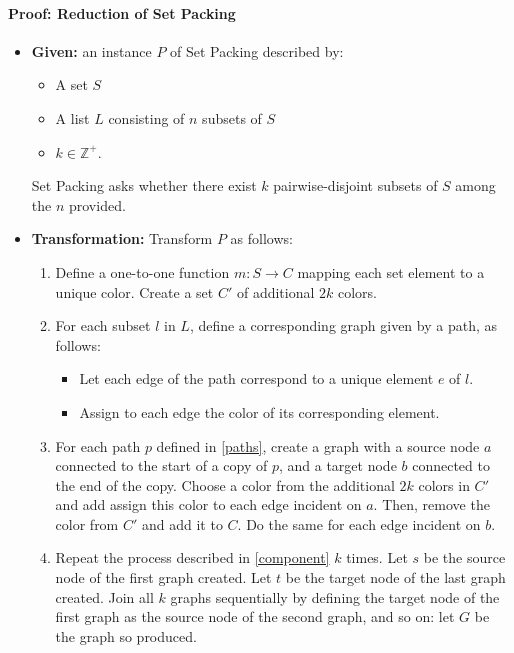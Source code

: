 \documentclass{article}
\begin{document}
  \paragraph{Proof: Reduction of Set Packing}
  \begin{itemize}
    \item \textbf{Given:} an instance $P$ of Set Packing described by:
      \begin{itemize}
        \item A set $S$
        \item A list $L$ consisting of $n$ subsets of $S$
        \item $k \in \mathbb{Z}^+$.
      \end{itemize}

      Set Packing asks whether there exist $k$ pairwise-disjoint
      subsets of $S$ among the $n$ provided.

    \item \label{transform} \textbf{Transformation:} Transform $P$
    as follows: 
      \begin{enumerate}
        \item Define a one-to-one function $m: S \rightarrow C$
        mapping each set element to a unique color. Create a set $C'$ 
        of additional $2k$ colors. 

        \item \label{paths} For each subset $l$ in $L$, define a
        corresponding graph given by a path, as follows: 
          \begin{itemize}
            \item Let each edge of the path correspond to a unique
            element $e$ of $l$.

            \item Assign to each edge the color of its corresponding
            element. 
          \end{itemize}

        \item \label{component} For each path $p$ defined in
        \ref{paths}, create a graph with a source node $a$ connected
        to the start of a copy of $p$, and a target node $b$ connected
        to the end of the copy. Choose a color from the additional
        $2k$ colors in $C'$ and add assign this color to each edge
        incident on $a$. Then, remove the color from $C'$ and add it
        to $C$. Do the same for each edge incident on $b$.

        \item Repeat the process described in \ref{component} $k$
        times. Let $s$ be the source node of the first graph created.
        Let $t$ be the target node of the last graph created. Join all
        $k$ graphs sequentially by defining the target node of the
        first graph as the source node of the second graph, and so on:
        let $G$ be the graph so produced.
        

\end{enumerate}
\end{itemize}
\end{document}
